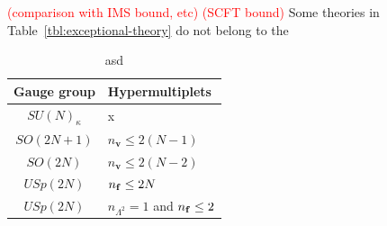 \documentclass[letterpaper, 11pt]{article}
\begin{document}
\textcolor{red}{(comparison with IMS bound, etc) (SCFT bound)} 
Some theories in Table~\ref{tbl:exceptional-theory} do not belong to the 

\begin{table}[tbp]
  \centering
  \begin{tabular}{@{}cl@{}}
    \toprule
    Gauge group  & Hypermultiplets    \\ \midrule
    $SU(N)_\kappa$ &x                               \\
    $SO(2N+1)$ & $n_{\mathbf{v}} \leq 2(N-1)$ \\
    $SO(2N)$   & $n_{\mathbf{v}} \leq 2(N-2)$ \\
    $USp(2N)$  & $n_{\bf f} \leq 2N$ \\
    $USp(2N)$  & $n_{\Lambda^2} = 1$ and $n_{\bf f} \leq 2$ \\ \bottomrule
    \end{tabular}
    \caption{asd}
    \label{tbl:infinite-theory}
\end{table}
\end{document}
